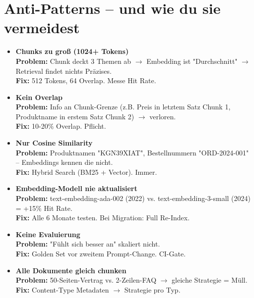 \section{Anti-Patterns -- und wie du sie vermeidest}

\begin{itemize}

    \item \textbf{Chunks zu groß (1024+ Tokens)} \hfill \\
    \textbf{Problem:} Chunk deckt 3 Themen ab $\to$ Embedding ist "Durchschnitt" $\to$ Retrieval findet nichts Präzises. \\
    \textbf{Fix:} 512 Tokens, 64 Overlap. Messe Hit Rate.
    
    \item \textbf{Kein Overlap} \hfill \\
    \textbf{Problem:} Info an Chunk-Grenze (z.B. Preis in letztem Satz Chunk 1, Produktname in erstem Satz Chunk 2) $\to$ verloren. \\
    \textbf{Fix:} 10-20\% Overlap. Pflicht.
    
    \item \textbf{Nur Cosine Similarity} \hfill \\
    \textbf{Problem:} Produktnamen "KGN39XIAT", Bestellnummern "ORD-2024-001" -- Embeddings kennen die nicht. \\
    \textbf{Fix:} Hybrid Search (BM25 + Vector). Immer.
    
    \item \textbf{Embedding-Modell nie aktualisiert} \hfill \\
    \textbf{Problem:} text-embedding-ada-002 (2022) vs. text-embedding-3-small (2024) = +15\% Hit Rate. \\
    \textbf{Fix:} Alle 6 Monate testen. Bei Migration: Full Re-Index.
    
    \item \textbf{Keine Evaluierung} \hfill \\
    \textbf{Problem:} "Fühlt sich besser an" skaliert nicht. \\
    \textbf{Fix:} Golden Set vor zweitem Prompt-Change. CI-Gate.
    
    \item \textbf{Alle Dokumente gleich chunken} \hfill \\
    \textbf{Problem:} 50-Seiten-Vertrag vs. 2-Zeilen-FAQ $\to$ gleiche Strategie = Müll. \\
    \textbf{Fix:} Content-Type Metadaten $\to$ Strategie pro Typ.
    

\end{itemize}
